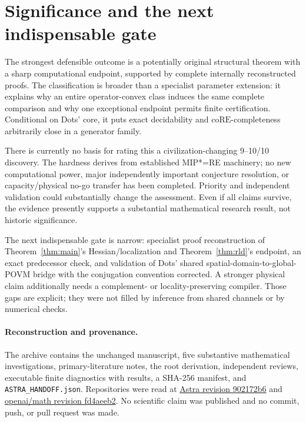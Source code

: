 \documentclass[11pt]{article}
\begin{document}
\section{Significance and the next indispensable gate}
The strongest defensible outcome is a potentially original structural theorem
with a sharp computational endpoint, supported by complete internally
reconstructed proofs. The classification is broader than a specialist
parameter extension: it explains why an entire operator-convex class induces
the same complete comparison and why one exceptional endpoint permits finite
certification. Conditional on Dots' core, it puts exact decidability and
\(\mathrm{coRE}\)-completeness arbitrarily close in a generator family.

There is currently no basis for rating this a civilization-changing 9--10/10
discovery. The hardness derives from established MIP*=RE machinery; no new
computational power, major independently important conjecture resolution, or
capacity/physical no-go transfer has been completed. Priority and independent
validation could substantially change the assessment. Even if all claims
survive, the evidence presently supports a substantial mathematical research
result, not historic significance.

The next indispensable gate is narrow: specialist proof reconstruction of
Theorem~\ref{thm:main}'s Hessian/localization and
Theorem~\ref{thm:rld}'s endpoint, an exact predecessor check, and validation of
Dots' shared spatial-domain-to-global-POVM bridge with the conjugation
convention corrected. A stronger physical claim additionally needs a
complement- or locality-preserving compiler. Those gaps are explicit; they
were not filled by inference from shared channels or by numerical checks.

\paragraph{Reconstruction and provenance.}
The archive contains the unchanged manuscript, five substantive mathematical
investigations, primary-literature notes, the root derivation, independent
reviews, executable finite diagnostics with results, a SHA-256 manifest, and
\texttt{ASTRA\_HANDOFF.json}. Repositories were read at
\href{https://github.com/harjassand/astra-research-knowledge/tree/902172b63c13874f5572e4f1336afad3694ea328}{Astra revision 902172b6}
and
\href{https://github.com/openai/math/tree/fd4aeeb2ee4fc729c18d98444fed42fd0529eeeb}{openai/math revision fd4aeeb2}.
No scientific claim was published and no commit, push, or pull request was made.
\end{document}
